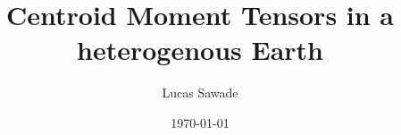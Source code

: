 \setlength{\oddsidemargin}{.5in}
\setlength{\evensidemargin}{.5in}
\setlength{\topmargin}{-.5in}
\setlength{\textheight}{9in}
\setlength{\textwidth}{6in}


\usepackage{setspace}
\doublespacing



\title{Centroid Moment Tensors in a heterogenous Earth}
\author{Lucas Sawade}
\date{\monthyeardate\today}

\makeatletter
\def\adviser#1{\gdef\@adviser{#1}}
\def\@tutor{\@latex@warning@no@line{No \noexpand\adviser given}}
\makeatother



\usepackage{fancyhdr}
\pagestyle{fancy}
\fancyhead{}
\fancyhead[R]{\thepage}
\fancyhead[L]{\textit{\nouppercase{\rightmark}}}
\fancyfoot{}


\usepackage{chapterbib}

\usepackage[round, sort, comma]{natbib}
%


\usepackage{graphicx}
\graphicspath{}

\usepackage{afterpage}

\usepackage{hyperref}

